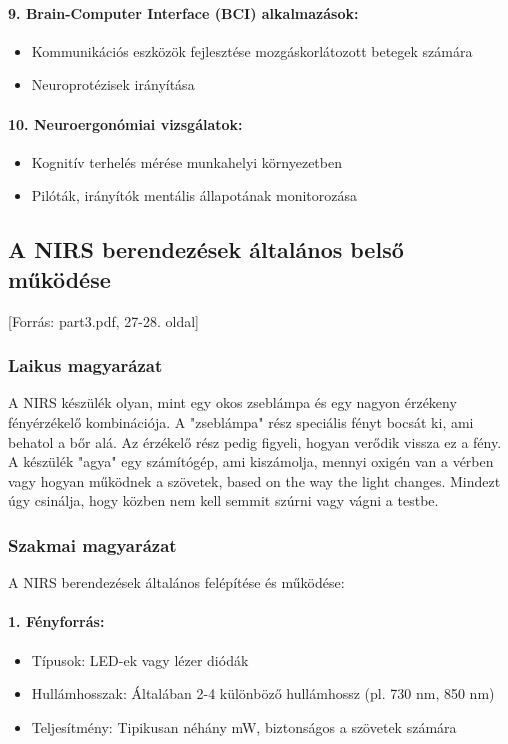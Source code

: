 \documentclass[a4paper,12pt]{article}
\begin{document}
\paragraph{9. Brain-Computer Interface (BCI) alkalmazások:} \begin{itemize} \item Kommunikációs eszközök fejlesztése mozgáskorlátozott betegek számára \item Neuroprotézisek irányítása \end{itemize}

\paragraph{10. Neuroergonómiai vizsgálatok:} \begin{itemize} \item Kognitív terhelés mérése munkahelyi környezetben \item Pilóták, irányítók mentális állapotának monitorozása \end{itemize}

\subsection{A NIRS berendezések általános belső működése} [Forrás: part3.pdf, 27-28. oldal]

\subsubsection{Laikus magyarázat} A NIRS készülék olyan, mint egy okos zseblámpa és egy nagyon érzékeny fényérzékelő kombinációja. A "zseblámpa" rész speciális fényt bocsát ki, ami behatol a bőr alá. Az érzékelő rész pedig figyeli, hogyan verődik vissza ez a fény. A készülék "agya" egy számítógép, ami kiszámolja, mennyi oxigén van a vérben vagy hogyan működnek a szövetek, based on the way the light changes. Mindezt úgy csinálja, hogy közben nem kell semmit szúrni vagy vágni a testbe.

\subsubsection{Szakmai magyarázat} A NIRS berendezések általános felépítése és működése:

\paragraph{1. Fényforrás:} \begin{itemize} \item Típusok: LED-ek vagy lézer diódák \item Hullámhosszak: Általában 2-4 különböző hullámhossz (pl. 730 nm, 850 nm) \item Teljesítmény: Tipikusan néhány mW, biztonságos a szövetek számára \end{itemize}
\end{document}
